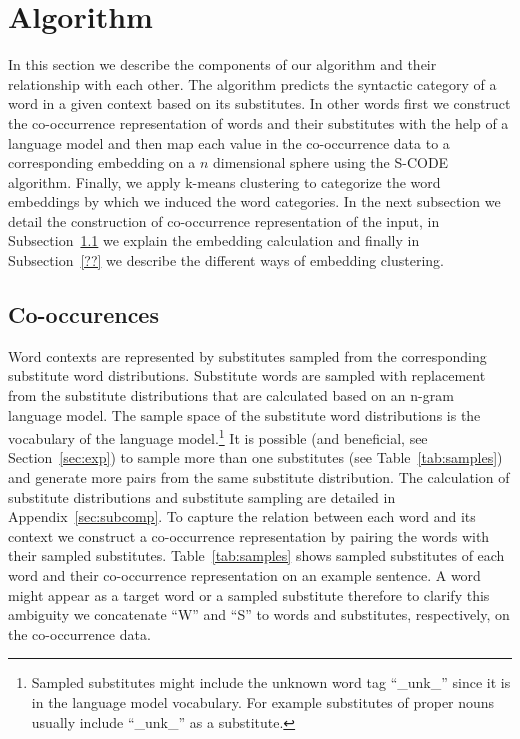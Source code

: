 \section{Algorithm}

In this section we describe the components of our algorithm and their
relationship with each other.  The algorithm predicts the syntactic
category of a word in a given context based on its substitutes.  In
other words first we construct the co-occurrence representation of
words and their substitutes with the help of a language model and then
map each value in the co-occurrence data to a corresponding embedding
on a $n$ dimensional sphere using the S-CODE algorithm.  Finally, we
apply k-means clustering to categorize the word embeddings by which we
induced the word categories.  In the next subsection we detail the
construction of co-occurrence representation of the input, in
Subsection~\ref{sec:cooc} we explain the embedding calculation and
finally in Subsection~\ref{??} we describe the different ways of
embedding clustering.

\subsection{Co-occurences}
\label{sec:cooc}

Word contexts are represented by substitutes sampled from the
corresponding substitute word distributions.  Substitute words are
sampled with replacement from the substitute distributions that are
calculated based on an n-gram language model.  The sample space of the
substitute word distributions is the vocabulary of the language
model.\footnote{Sampled substitutes might include the unknown word tag
  ``\_unk\_'' since it is in the language model vocabulary.  For
  example substitutes of proper nouns usually include ``\_unk\_'' as a
  substitute.}  It is possible (and beneficial, see
Section~\ref{sec:exp}) to sample more than one substitutes (see
Table~\ref{tab:samples}) and generate more pairs from the same
substitute distribution.  The calculation of substitute distributions
and substitute sampling are detailed in Appendix~\ref{sec:subcomp}.
To capture the relation between each word and its context we construct
a co-occurrence representation by pairing the words with their sampled
substitutes.  Table~\ref{tab:samples} shows sampled substitutes of
each word and their co-occurrence representation on an example
sentence.  A word might appear as a target word or a sampled
substitute therefore to clarify this ambiguity we concatenate ``W''
and ``S'' to words and substitutes, respectively, on the co-occurrence
data.

